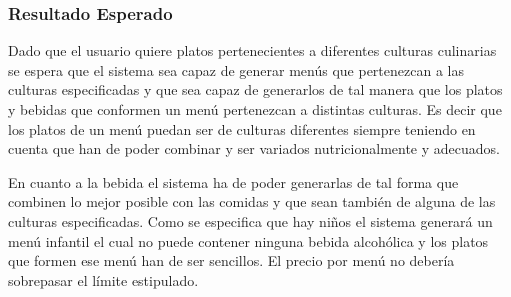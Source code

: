 \documentclass{article}
\begin{document}
\subsubsection{Resultado Esperado}
Dado que el usuario quiere platos pertenecientes a diferentes culturas culinarias se espera que el sistema sea capaz de generar menús que pertenezcan a las culturas especificadas y que sea capaz de generarlos de tal manera que los platos y bebidas que conformen un menú pertenezcan a distintas culturas. Es decir que los platos de un menú puedan ser de culturas diferentes siempre teniendo en cuenta que han de poder combinar y ser variados nutricionalmente y adecuados.
\par
En cuanto a la bebida el sistema ha de poder generarlas de tal forma que combinen lo mejor posible con las comidas y que sean también de alguna de las culturas especificadas. Como se especifica que hay niños el sistema generará un menú infantil el cual no puede contener ninguna bebida alcohólica y los platos que formen ese menú han de ser sencillos. El precio por menú no debería sobrepasar el límite estipulado.
\end{document}
